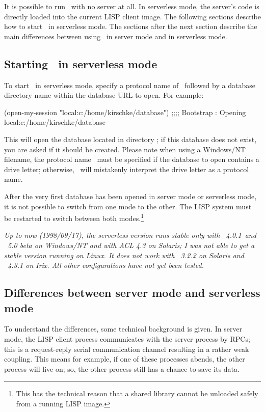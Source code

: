 It is possible to run \plob\ with no server at all. In serverless
mode, the server's code is directly loaded into the current LISP
client image. The following sections describe how to start \plob\ in
serverless mode. The sections after the next section describe the main
differences between using \plob\ in server mode and in serverless
mode.

\subsection[Starting PLOB in serverless mode]
{Starting \protect\plob\ in serverless mode}

To start \plob\ in serverless mode, specify a protocol name of
\ followed by a database directory name within the database
URL to open. For example:
\begin{CompactCode}
\listener{}(open-my-session "local:c:/home/kirschke/database")
;;;; Bootstrap   : Opening local:c:/home/kirschke/database
\OmitUnimportant
\end{CompactCode}
This will open the database located in directory
; if this database does not exist, you
are asked if it should be created. Please note when using a Windows/NT
filename, the protocol name \ must be specified if
the database to open contains a drive letter; otherwise, \plob\ will
mistakenly interpret the drive letter as a protocol name.

After the very first database has been opened in server mode or
serverless mode, it is not possible to switch from one mode to the
other. The LISP system must be restarted to switch between both
modes.\footnote{This has the technical reason that a shared library
  cannot be unloaded safely from a running LISP image.}

\emph{Up to now (1998/09/17), the serverless version runs stable only
  with \lwcl\ 4.0.1\ and \allegrocl\ 5.0 beta on Windows/NT and with
  ACL 4.3 on Solaris; I was not able to get a stable version running
  on Linux. It does not work with \lwcl\ 3.2.2 on Solaris and
  \allegrocl\ 4.3.1 on Irix. All other configurations have not yet
  been tested.}

\subsection[Server and serverless mode]
{Differences between server mode and serverless mode}

To understand the differences, some technical background is given. In
server mode, the LISP client process communicates with the server
process by RPCs; this is a request-reply serial communication channel
resulting in a rather weak coupling. This means for example, if one of
these processes abends, the other process will live on; so, the other
process still has a chance to save its data.

